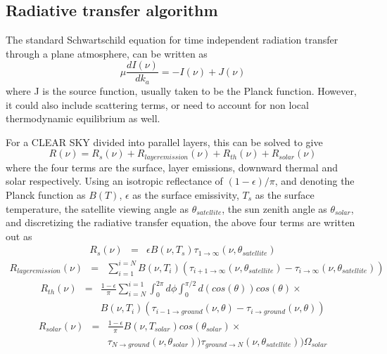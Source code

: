 \documentclass[12pt]{article}
\begin{document}
{{{{\subsection{Radiative transfer algorithm}

The standard Schwartschild equation for time independent radiation transfer 
through a plane atmosphere, can be written as \cite{goo:89,edw:92}
\[
\mu \frac{dI(\nu)}{dk_{a}} = -I(\nu) + J(\nu)
\]
where J is the source function, usually taken to be the Planck function.
However, it could also include scattering terms, or need to account for 
non local thermodynamic equilibrium as well.

For a CLEAR SKY divided into parallel layers, this can be solved to give
\begin{equation}
R(\nu) = R_{s}(\nu) + R_{layer emission}(\nu) + R_{th}(\nu) + R_{solar}(\nu)
\end{equation}
where the four terms are the surface, layer emissions, downward
thermal and solar respectively.  Using an isotropic reflectance of
$(1-\epsilon)/\pi$, and denoting the Planck function as $B(T)$,
$\epsilon$ as the surface emissivity, $T_{s}$ as the surface
temperature, the satellite viewing angle as $\theta_{satellite}$, the
sun zenith angle as $\theta_{solar}$, and discretizing the radiative
transfer equation, the above four terms are written out as
\begin{eqnarray*}
R_{s}(\nu) & = & \epsilon B(\nu,T_{s})
\tau_{1 \rightarrow \infty}(\nu,\theta_{satellite})
\end{eqnarray*}
\begin{eqnarray*}
R_{layer emission}(\nu) & = & \sum_{i=1}^{i=N} B(\nu,T_{i})
(\tau_{i+1 \rightarrow \infty}(\nu,\theta_{satellite})-
 \tau_{i \rightarrow \infty}(\nu,\theta_{satellite}))
\end{eqnarray*}
\begin{eqnarray*}
R_{th}(\nu) & = & \frac{1 - \epsilon}{\pi} \sum_{i=N}^{i=1} 
\int_{0}^{2\pi}d\phi 
\int_{0}^{\pi/2} d(cos(\theta)) cos(\theta) \times \\ 
& & B(\nu,T_{i})(\tau_{i-1 \rightarrow ground}(\nu,\theta)-
 \tau_{i \rightarrow ground}(\nu,\theta))
\end{eqnarray*}
\begin{eqnarray*}
R_{solar}(\nu) & = & \frac{1 - \epsilon}{\pi} 
B(\nu,T_{solar})cos(\theta_{solar}) \times \\
& &                 \tau_{N \rightarrow ground}(\nu,\theta_{solar}))
                 \tau_{ground \rightarrow N}(\nu,\theta_{satellite}))
                 \Omega_{solar}
\end{eqnarray*}

}}}}
\end{document}
